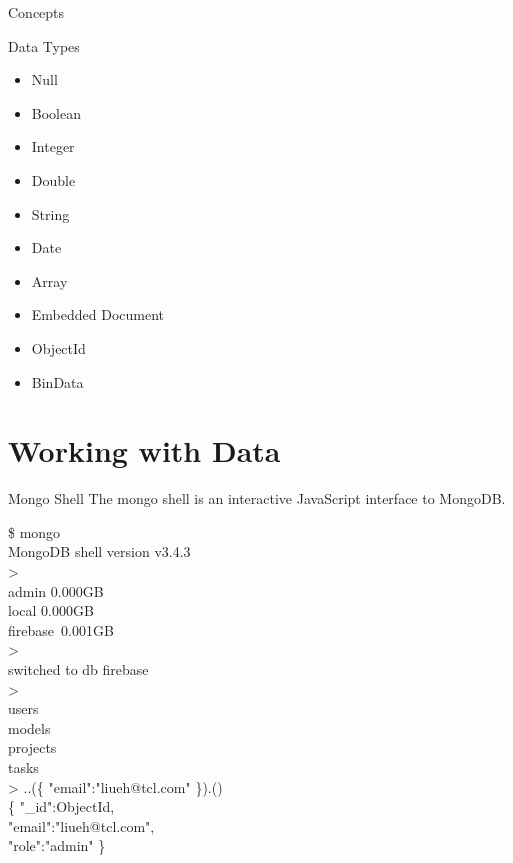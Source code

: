 \documentclass{beamer}
\begin{document}
\begin{frame}{Concepts}
	
\end{frame}

\begin{frame}{Data Types}
    \begin{itemize}
        \item Null
        \item Boolean
        \item Integer
        \item Double
        \item String
        \item Date
        \item Array
        \item Embedded Document
        \item ObjectId
        \item BinData
    \end{itemize}
\end{frame}

\section{Working with Data}
\begin{frame}{Mongo Shell}
    The mongo shell is an interactive JavaScript interface to MongoDB. 
    \begin{minipage}[t]{0.5\textwidth}
    	\scriptsize
    	\begin{Alms*}
    		\$ mongo \\
    		MongoDB shell version v3.4.3 \\
    		>   \\
    		admin \qquad 0.000GB\\
    		local \qquad 0.000GB\\
    		firebase \,0.001GB\\
    		>   \\
    		switched to db firebase \\
    		>   \\
    		users \\
    		models \\
    		projects \\
    		tasks \\
    		> ..(\{
    		 \NI
    		"email":"liueh@tcl.com"
    		\ND \}).() \\
    		\{ \NI
    		"\_id":ObjectId, \\
    		"email":"liueh@tcl.com", \\
    		"role":"admin"
    		\ND \}
    	\end{Alms*}
    \end{minipage}
\end{frame}
\end{document}

